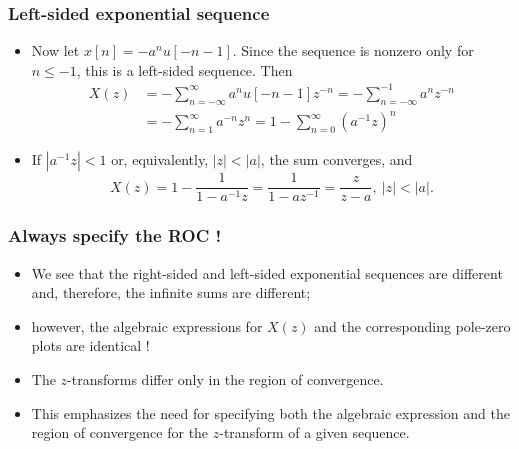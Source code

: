 \begin{frame}
\frametitle{Left-sided exponential sequence}
\begin{itemize}
\item Now let $x[n]=-a^{n}u[-n-1]$. Since the sequence is nonzero only for $n\leq-1$, this is a \alert{left-sided} sequence. 
Then
\begin{align*}
X(z)&=-\sum_{n=-\infty}^{\infty}a^{n}u[-n-1]z^{-n}=-\sum_{n=-\infty}^{-1}a^{n}z^{-n} \\
&=-\sum_{n=1}^{\infty}a^{-n}z^{n}=1-\sum_{n=0}^{\infty}(a^{-1}z)^{n}
\end{align*}
\item If $|a^{-1}z|<1$ or, equivalently, $|z|<|a|$, the sum  converges, and
$$
X(z)=1-\frac{1}{1-a^{-1}z}=\frac{1}{1-az^{-1}}=\frac{z}{z-a},\ |z|<|a|.
$$
\end{itemize}
\end{frame}

\begin{frame}
\frametitle{Always specify the ROC !}
\begin{itemize}
\item We see that the right-sided and left-sided exponential sequences are different and, therefore, the infinite sums are different; 
\item however, the algebraic expressions for $X(z)$ and the corresponding pole-zero plots are identical !
\item The $z$-transforms differ only in the \alert{region of convergence}. 
\item This emphasizes the need for specifying \alert{both} the \alert{algebraic expression} and \alert{the region of convergence} for the $z$-transform of a given sequence. 
\end{itemize}
\end{frame}


